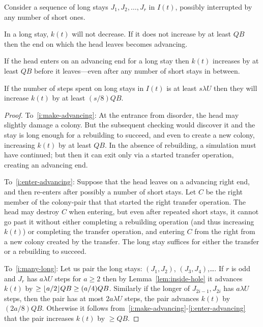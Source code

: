 \documentclass[11pt]{memoir}
\theoremstyle{definition} %
\renewcommand{\ge}{\geq}
\def\B{B}
\def\U{U}
\newcommand{\Q}{Q} %
\begin{document}
\begin{lemma}\label{lem:long-stays}
  Consider a sequence of long stays \( J_{1},J_{2},\dots,J_{r} \)
  in \( I(t) \), possibly interrupted by any number of short ones.
  \begin{alphenum}
  \item\label{i:make-advancing}
    In a long stay, \( k(t) \) will not decrease.
    If it does not increase by at least \( \Q\B \)
    then the end on which the head leaves becomes advancing.
  \item\label{i:enter-advancing}
    If the head enters on an advancing end for a long stay
    then \( k(t) \) increases by at least \( \Q\B \) before it leaves---even
    after any number of short stays in between.
  \item\label{i:many-long}
    If the number of steps spent on long stays in \( I(t) \) is at least \( s\lambda\U \) then
    they will increase \( k(t) \) by at least \( (s/8)\Q\B \).
  \end{alphenum}
\end{lemma}
\begin{proof}
  To~\eqref{i:make-advancing}:
  At the entrance from disorder, the head may slightly damage a colony.
  But the subsequent checking would discover it and the stay is long enough for a rebuilding to succeed,
  and even to create a new colony, increasing \( k(t) \) by at least  \( \Q\B \). 
  In the absence of rebuilding, a simulation must have continued;
  but then it can exit only via a started transfer operation, creating an advancing end.

  To~\eqref{i:enter-advancing}:
  Suppose that the head leaves on a advancing right end, and then re-enters after
  possibly a number of short stays.
  Let \( C \) be the right member of the colony-pair that
  that started the right transfer operation.
  The head may destroy \( C \) when entering, but even after repeated short stays, it cannot go past it
  without either completing a rebuilding operation (and thus increasing \( k(t) \)) or
  completing the transfer operation, and entering \( C \) from the right from a new colony
  created by the transfer.
  The long stay suffices for either the transfer or a rebuilding to succeed.

  To~\eqref{i:many-long}:
  Let us pair the long stays: \( (J_{1},J_{2}) \), \( (J_{3},J_{4}) \),\dots.
  If \( r \) is odd and \( J_{r} \) has \( a\lambda\U \) steps for \( a\ge 2 \)
  then by Lemma~\ref{lem:inside-hole}
  it advances \( k(t) \) by \( \ge\flo{a/2}\Q\B\ge (a/4)\Q\B \).
  Similarly if the longer of \( J_{2i-1},J_{2 i} \) has \( a\lambda\U \) steps, then the pair has
  at most \( 2a\lambda\U \) steps, the pair advances \( k(t) \) by \( (2 a/8)\Q\B \).
  Otherwise it follows from~\eqref{i:make-advancing}-\eqref{i:enter-advancing} that the pair increases \( k(t) \) by
  \( \ge\Q\B \).  
\end{proof}
\end{document}
